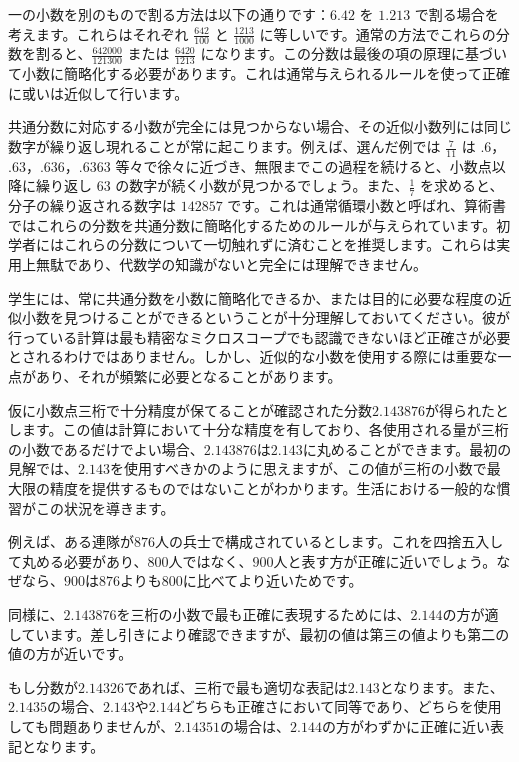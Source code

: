 \documentclass[a4paper,11pt,openany]{ltjsbook}
\begin{document}
一の小数を別のもので割る方法は以下の通りです：$6.42$ を $1.213$ で割る場合を考えます。これらはそれぞれ $\frac{642}{100}$ と $\frac{1213}{1000}$ に等しいです。通常の方法でこれらの分数を割ると、$\frac{642000}{121300}$ または $\frac{6420}{1213}$ になります。この分数は最後の項の原理に基づいて小数に簡略化する必要があります。これは通常与えられるルールを使って正確に或いは近似して行います。

共通分数に対応する小数が完全には見つからない場合、その近似小数列には同じ数字が繰り返し現れることが常に起こります。例えば、選んだ例では $\frac{7}{11}$ は $.6$，$.63$，$.636$，$.6363$ 等々で徐々に近づき、無限までこの過程を続けると、小数点以降に繰り返し $63$ の数字が続く小数が見つかるでしょう。また、$\frac{1}{7}$ を求めると、分子の繰り返される数字は $142857$ です。これは通常循環小数と呼ばれ、算術書ではこれらの分数を共通分数に簡略化するためのルールが与えられています。初学者にはこれらの分数について一切触れずに済むことを推奨します。これらは実用上無駄であり、代数学の知識がないと完全には理解できません。

学生には、常に共通分数を小数に簡略化できるか、または目的に必要な程度の近似小数を見つけることができるということが十分理解しておいてください。彼が行っている計算は最も精密なミクロスコープでも認識できないほど正確さが必要とされるわけではありません。しかし、近似的な小数を使用する際には重要な一点があり、それが頻繁に必要となることがあります。

仮に小数点三桁で十分精度が保てることが確認された分数$2.143876$が得られたとします。この値は計算において十分な精度を有しており、各使用される量が三桁の小数であるだけでよい場合、$2.143876$は$2.143$に丸めることができます。最初の見解では、$2.143$を使用すべきかのように思えますが、この値が三桁の小数で最大限の精度を提供するものではないことがわかります。生活における一般的な慣習がこの状況を導きます。

例えば、ある連隊が$876$人の兵士で構成されているとします。これを四捨五入して丸める必要があり、$800$人ではなく、$900$人と表す方が正確に近いでしょう。なぜなら、$900$は$876$よりも$800$に比べてより近いためです。

同様に、$2.143876$を三桁の小数で最も正確に表現するためには、$2.144$の方が適しています。差し引きにより確認できますが、最初の値は第三の値よりも第二の値の方が近いです。

もし分数が$2.14326$であれば、三桁で最も適切な表記は$2.143$となります。また、$2.1435$の場合、$2.143$や$2.144$どちらも正確さにおいて同等であり、どちらを使用しても問題ありませんが、$2.14351$の場合は、$2.144$の方がわずかに正確に近い表記となります。
\end{document}
